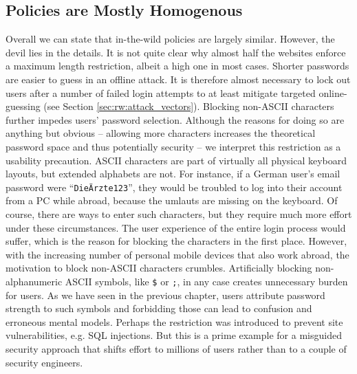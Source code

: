 \subsection{Policies are Mostly Homogenous}
Overall we can state that in-the-wild policies are largely similar. However, the devil lies in the details. It is not quite clear why almost half the websites enforce a maximum length restriction, albeit a high one in most cases. Shorter passwords are easier to guess in an offline attack. It is therefore almost necessary to lock out users after a number of failed login attempts to at least mitigate targeted online-guessing (see Section \ref{sec:rw:attack_vectors}). Blocking non-ASCII characters further impedes users' password selection. Although the reasons for doing so are anything but obvious -- allowing more characters increases the theoretical password space and thus potentially security -- we interpret this restriction as a usability precaution. ASCII characters are part of virtually all physical keyboard layouts, but extended alphabets are not. For instance, if a German user's email password were ``\texttt{DieÄrzte123}'', they would be troubled to log into their account from a PC while abroad, because the umlauts are missing on the keyboard. Of course, there are ways to enter such characters, but they require much more effort under these circumstances. The user experience of the entire login process would suffer, which is the reason for blocking the characters in the first place. However, with the increasing number of personal mobile devices that also work abroad, the motivation to block non-ASCII characters crumbles. Artificially blocking non-alphanumeric ASCII symbols, like \texttt{\$} or \texttt{;}, in any case creates unnecessary burden for users. As we have seen in the previous chapter, users attribute password strength to such symbols and forbidding those can lead to confusion and erroneous mental models. Perhaps the restriction was introduced to prevent site vulnerabilities, e.g. SQL injections. But this is a prime example for a misguided security approach that shifts effort to millions of users rather than to a couple of security engineers. 

